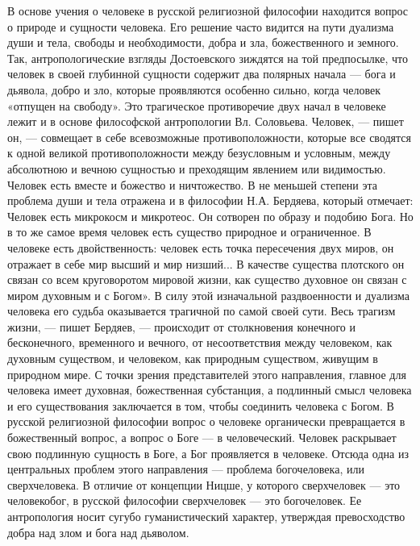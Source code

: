 \documentclass[12pt]{article}
\begin{document}
В  основе  учения  о  человеке  в  русской  религиозной  философии  находится  вопрос  о  природе  и  сущности
человека. Его решение часто видится на пути дуализма души и тела, свободы и необходимости, добра и зла,
божественного и земного. Так, антропологические взгляды Достоевского зиждятся на той предпосылке, что
человек в своей глубинной сущности содержит два полярных начала — бога и дьявола, добро и зло, которые
проявляются особенно сильно, когда человек «отпущен на свободу».
Это  трагическое  противоречие  двух  начал  в  человеке  лежит  и  в  основе  философской  антропологии  Вл.
Соловьева.
Человек, — пишет он, — совмещает в себе всевозможные противоположности, которые все сводятся к одной
великой  противоположности  между  безусловным  и  условным,  между  абсолютною  и  вечною  сущностью  и
преходящим явлением или видимостью. Человек есть вместе и божество и ничтожество.
В не меньшей степени эта проблема души и тела отражена и в философии Н.А. Бердяева, который отмечает:
Человек есть микрокосм и микротеос. Он сотворен по образу и подобию Бога. Но в то же самое время человек
есть существо природное и ограниченное. В человеке есть двойственность: человек есть точка пересечения
двух миров, он отражает в себе мир высший и мир низший... В качестве существа плотского он связан со всем
круговоротом мировой жизни, как существо духовное он связан с миром духовным и с Богом».
В силу этой изначальной раздвоенности и дуализма человека его судьба оказывается трагичной по самой своей
сути.
Весь трагизм жизни, — пишет Бердяев, — происходит от столкновения конечного и бесконечного, временного и
вечного,  от  несоответствия  между  человеком,  как  духовным  существом,  и  человеком,  как  природным
существом, живущим в природном мире.
С  точки  зрения  представителей  этого  направления,  главное  для  человека  имеет  духовная,  божественная
субстанция, а подлинный смысл человека и его существования заключается в том, чтобы соединить человека с
Богом.  В  русской  религиозной  философии  вопрос  о  человеке  органически  превращается  в  божественный
вопрос, а вопрос о Боге — в человеческий. Человек раскрывает свою подлинную сущность в Боге, а Бог
проявляется в человеке. Отсюда одна из центральных проблем этого направления — проблема богочеловека,
или сверхчеловека. В отличие от концепции Ницше, у которого сверхчеловек — это человекобог, в русской
философии  сверхчеловек  —  это  богочеловек.  Ее  антропология  носит  сугубо  гуманистический  характер,
утверждая превосходство добра над злом и бога над дьяволом.

\newpage
\end{document}
